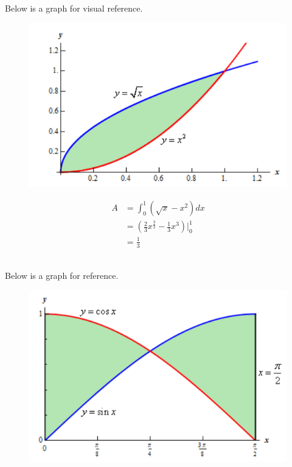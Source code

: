         \noindent Below is a graph for visual reference.

        \begin{figure}[hbt!]
            \centering
            \includegraphics[scale=0.75]{Resources/Unit5IntegrationApps/Area3}
        \end{figure}

        \begin{align*}
            A &= \int^1_0 (\sqrt{x}-x^2)dx \\
            &= \left(\frac{2}{3}x^{\frac{3}{2}}-\frac{1}{3}x^3\right)\Bigg|^1_0 \\
            &= \frac{1}{3}
        \end{align*}

        \noindent \color{blue}  \color{black} \\

        \noindent Below is a graph for reference. \\

        \begin{figure}[hbt!]
            \centering
            \includegraphics[scale=0.75]{Resources/Unit5IntegrationApps/Area4}
        \end{figure}

